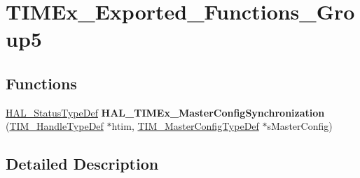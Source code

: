 \hypertarget{group___t_i_m_ex___exported___functions___group5}{}\section{T\+I\+M\+Ex\+\_\+\+Exported\+\_\+\+Functions\+\_\+\+Group5}
\label{group___t_i_m_ex___exported___functions___group5}
\subsection*{Functions}
\begin{DoxyCompactItemize}
\item 
\mbox{\label{group___t_i_m_ex___exported___functions___group5_ga056fd97d3be6c60dcfa12963f6ec8aad}} 
\hyperlink{stm32f1xx__hal__def_8h_a63c0679d1cb8b8c684fbb0632743478f}{H\+A\+L\+\_\+\+Status\+Type\+Def} {\bfseries H\+A\+L\+\_\+\+T\+I\+M\+Ex\+\_\+\+Master\+Config\+Synchronization} (\hyperlink{struct_t_i_m___handle_type_def}{T\+I\+M\+\_\+\+Handle\+Type\+Def} $\ast$htim, \hyperlink{struct_t_i_m___master_config_type_def}{T\+I\+M\+\_\+\+Master\+Config\+Type\+Def} $\ast$s\+Master\+Config)
\end{DoxyCompactItemize}


\subsection{Detailed Description}
